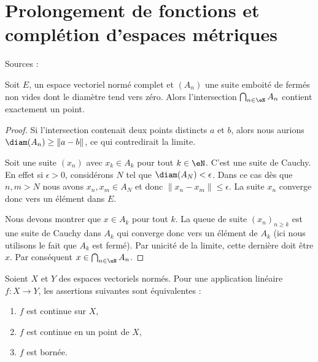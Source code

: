 \section{Prolongement de fonctions et complétion d'espaces métriques}

Sources : \cite{RasclAnaFonc}

\begin{lemma}   \label{LemdCOMQM}
    Soit \( E\), un espace vectoriel normé complet et \( (A_n)\) une suite emboité de fermés non vides dont le diamètre tend vers zéro. Alors l'intersection \( \bigcap_{n\in \eN}A_n\) contient exactement un point.
\end{lemma}

\begin{proof}
    Si l'intersection contenait deux points distincts \( a\) et \( b\), alors nous aurions \( \diam(A_n)\geq\| a-b \|\), ce qui contredirait la limite.

    Soit une suite \( (x_n)\) avec \( x_k\in A_k\) pour tout \( k\in \eN\). C'est une suite de Cauchy. En effet si \( \epsilon>0\), considérons \( N\) tel que \( \diam(A_N)<\epsilon\). Dans ce cas dès que \( n,m>N\) nous avons \( x_n,x_m\in A_{N}\) et donc \( \| x_n-x_m \|\leq \epsilon\). La suite \( x_n\) converge donc vers un élément dans \( E\).

    Nous devons montrer que \( x\in A_k\) pour tout \( k\). La queue de suite \( (x_n)_{n\geq k}\) est une suite de Cauchy dans \( A_k\) qui converge donc vers un élément de \( A_k\) (ici nous utilisons le fait que \( A_k\) est fermé). Par unicité de la limite, cette dernière doit être \( x\). Par conséquent \( x\in\bigcap_{n\in \eN}A_n\).
\end{proof}

\begin{theorem}      \label{ThoCaMpKO}
    Soient \( X\) et \( Y\) des espaces vectoriels normés. Pour une application linéaire \( f\colon X\to Y\), les assertions suivantes sont équivalentes :
    \begin{enumerate}
        \item
            \( f\) est continue sur \( X\),
        \item
            \( f\) est continue en un point de \( X\),
        \item
            \( f\) est bornée.
    \end{enumerate}
\end{theorem}


